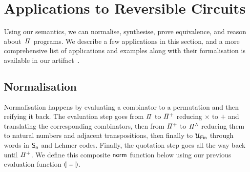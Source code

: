 \section{Applications to Reversible Circuits}
\label{sec:applications}

Using our semantics, we can normalise, synthesise, prove equivalence, and reason about~$\mathit{\Pi}$ programs. We describe a
few applications in this section, and a more comprehensive list of applications and examples along with their
formalisation is available in our artifact~\cite{choudhuryArtifactSymmetriesReversible2021}.



\subsection{Normalisation}

Normalisation happens by evaluating a combinator to a permutation and then reifying it back. The evaluation step goes
from $\mathit{\Pi}$ to $\mathit{{\Pi}^{+}}$ reducing $\times$ to $+$ and translating the corresponding combinators, then from
$\mathit{{\Pi}^{+}}$ to $\mathit{{\Pi}^{\wedge}}$ reducing them to natural numbers and adjacent transpositions, then finally to $\UFin$
through words in $\Sn$ and Lehmer codes. Finally, the quotation step goes all the way back until $\mathit{{\Pi}^{+}}$. We
define this composite $\normt$ function below using our previous evaluation function $\llparenthesis~{\scriptstyle{-}}~\rrparenthesis$.

